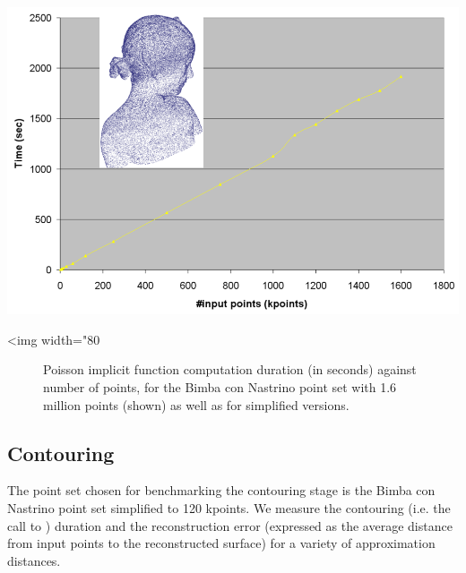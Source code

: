 \begin{center}
    \label{Surface_reconstruction_points_3-fig-poisson_bench}
    \begin{ccTexOnly}
      \includegraphics[width=1.0\textwidth]{Surface_reconstruction_points_3/poisson_bench} %
    \end{ccTexOnly}
    \begin{ccHtmlOnly}
        <img width="80%
    \end{ccHtmlOnly}
    \begin{figure}[h]
        \caption{Poisson implicit function computation duration (in seconds) against number of points,
                 for the Bimba con Nastrino point set with 1.6 million points (shown)
                 as well as for simplified versions.}
    \end{figure}
\end{center}



\subsection{Contouring}

The point set chosen for benchmarking the contouring stage is the Bimba con Nastrino point set simplified to 120 kpoints. We measure the contouring (i.e. the call to ) duration and the reconstruction error (expressed as the average distance from input points to the reconstructed surface) for a variety of approximation distances.

